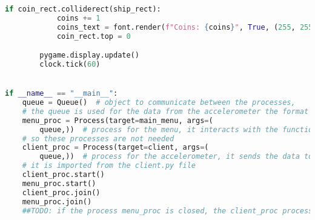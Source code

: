 \documentclass[12pt]{report}			%
\begin{document}
\begin{appendices}
\begin{lstlisting}[title={Program hra.py}, caption={hra.py},  label={lst:hra}, language=Python]
        if coin_rect.colliderect(ship_rect):
            coins += 1
            coins_text = font.render(f"Coins: {coins}", True, (255, 255, 255))
            coin_rect.top = 0

        pygame.display.update()
        clock.tick(60)


if __name__ == "__main__":
    queue = Queue()  # object to communicate between the processes,
    # the queue is used for the data from the accelerometer the format is [x, y, z]
    menu_proc = Process(target=main_menu, args=(
        queue,))  # process for the menu, it interacts with the functions App() and Score(),
    # so these processes are not needed
    client_proc = Process(target=client, args=(
        queue,))  # process for the accelerometer, it sends the data to the queue,
    # it is imported from the client.py file
    client_proc.start()
    menu_proc.start()
    client_proc.join()
    menu_proc.join()
    ##TODO: if the process menu_proc is closed, the client_proc processes should be closed too

\end{lstlisting}
	\end{appendices}
\end{document}
